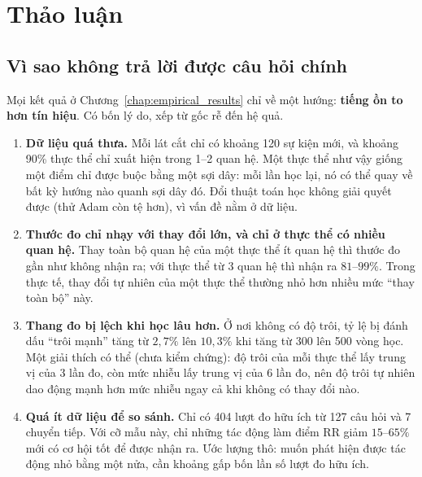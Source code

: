 \chapter{Thảo luận}
\label{chap:discussion}

\section{Vì sao không trả lời được câu hỏi chính}
\label{sec:why_not_testable}
Mọi kết quả ở Chương~\ref{chap:empirical_results} chỉ về một hướng: \textbf{tiếng ồn to hơn tín hiệu}. Có bốn lý do, xếp từ gốc rễ đến hệ quả.

\begin{enumerate}
    \item \textbf{Dữ liệu quá thưa.} Mỗi lát cắt chỉ có khoảng 120 sự kiện mới, và khoảng 90\% thực thể chỉ xuất hiện trong 1--2 quan hệ. Một thực thể như vậy giống một điểm chỉ được buộc bằng một sợi dây: mỗi lần học lại, nó có thể quay về bất kỳ hướng nào quanh sợi dây đó. Đổi thuật toán học không giải quyết được (thử Adam còn tệ hơn), vì vấn đề nằm ở dữ liệu.
    \item \textbf{Thước đo chỉ nhạy với thay đổi lớn, và chỉ ở thực thể có nhiều quan hệ.} Thay toàn bộ quan hệ của một thực thể ít quan hệ thì thước đo gần như không nhận ra; với thực thể từ 3 quan hệ thì nhận ra $81$--$99\%$. Trong thực tế, thay đổi tự nhiên của một thực thể thường nhỏ hơn nhiều mức ``thay toàn bộ'' này.
    \item \textbf{Thang đo bị lệch khi học lâu hơn.} Ở nơi không có độ trôi, tỷ lệ bị đánh dấu ``trôi mạnh'' tăng từ $2{,}7\%$ lên $10{,}3\%$ khi tăng từ 300 lên 500 vòng học. Một giải thích có thể (chưa kiểm chứng): độ trôi của mỗi thực thể lấy trung vị của 3 lần đo, còn mức nhiễu lấy trung vị của 6 lần đo, nên độ trôi tự nhiên dao động mạnh hơn mức nhiễu ngay cả khi không có thay đổi nào.
    \item \textbf{Quá ít dữ liệu để so sánh.} Chỉ có 404 lượt đo hữu ích từ 127 câu hỏi và 7 chuyển tiếp. Với cỡ mẫu này, chỉ những tác động làm điểm RR giảm $15$--$65\%$ mới có cơ hội tốt để được nhận ra. Ước lượng thô: muốn phát hiện được tác động nhỏ bằng một nửa, cần khoảng gấp bốn lần số lượt đo hữu ích.
\end{enumerate}

